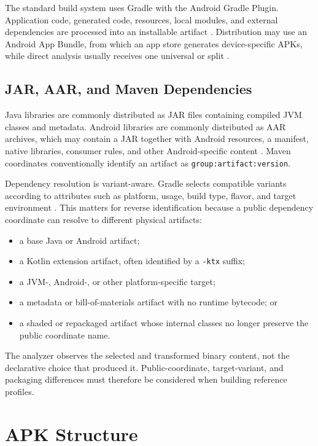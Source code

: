 The standard build system uses Gradle with the Android Gradle Plugin.
Application code, generated code, resources, local modules, and external
dependencies are processed into an installable artifact
\cite{androidBuildOverview}. Distribution may use an Android App Bundle,
from which an app store generates device-specific APKs, while direct analysis
usually receives one universal or split \APK.

\subsection{JAR, AAR, and Maven Dependencies}

Java libraries are commonly distributed as JAR files containing compiled JVM
classes and metadata. Android libraries are commonly distributed as AAR
archives, which may contain a JAR together with Android resources, a manifest,
native libraries, consumer rules, and other Android-specific content
\cite{androidLibrary}. Maven coordinates conventionally identify an artifact
as \texttt{group:artifact:version}.

Dependency resolution is variant-aware. Gradle selects compatible variants
according to attributes such as platform, usage, build type, flavor, and
target environment \cite{gradleVariantResolution}. This matters for reverse
identification because a public dependency coordinate can resolve to
different physical artifacts:

\begin{itemize}
  \item a base Java or Android artifact;
  \item a Kotlin extension artifact, often identified by a \texttt{-ktx}
  suffix;
  \item a JVM-, Android-, or other platform-specific target;
  \item a metadata or bill-of-materials artifact with no runtime bytecode; or
  \item a shaded or repackaged artifact whose internal classes no longer
  preserve the public coordinate name.
\end{itemize}

The analyzer observes the selected and transformed binary content, not the
declarative choice that produced it. Public-coordinate, target-variant, and
packaging differences must therefore be considered when building reference
profiles.

\section{APK Structure}

